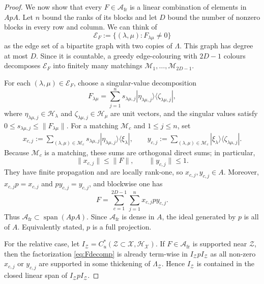 \documentclass[10pt,a4paper]{amsart}
\newcommand{\Hh}{{\mathcal H}}
\newcommand{\Xx}{{\mathcal X}}
\newcommand{\Zz}{{\mathcal Z}}
\begin{document}
\begin{proof}
We now show that every $F\in\mathcal A_{\mathrm{fr}}$ is a linear combination of elements in $ApA$.  Let
$n$ bound the ranks of its blocks and let $D$ bound the number of nonzero
blocks in every row and column.  We can think of
\[\mathcal E_F:=\{(\lambda,\mu):F_{\lambda\mu}\neq0\}\]
as the edge set of a bipartite graph with two copies of $\Lambda$.  This graph
has degree at most $D$.  Since it is countable, a greedy edge-colouring with
$2D-1$ colours decomposes $\mathcal E_F$ into finitely many matchings
$\mathcal M_1,\ldots,\mathcal M_{2D-1}$.

For each
$(\lambda,\mu)\in\mathcal E_F$, choose a singular-value decomposition
\[
F_{\lambda\mu} =\sum_{j=1}^n s_{\lambda\mu,j} |\eta_{\lambda\mu,j}\rangle \langle \zeta_{\lambda\mu,j}|,\]
where $\eta_{\lambda\mu,j}\in\Hh_\lambda$ and
$\zeta_{\lambda\mu,j}\in\Hh_\mu$ are unit vectors, and the singular values satisfy
$0\leq s_{\lambda\mu,j}\leq\|F_{\lambda\mu}\|$.  For a matching
$\mathcal M_c$ and $1\leq j\leq n$, set
\begin{align*}
 x_{c,j}:=\sum_{(\lambda,\mu)\in\mathcal M_c}
     s_{\lambda\mu,j}
    |\eta_{\lambda\mu,j}\rangle \langle \xi_\lambda|, \qquad
 y_{c,j}:=\sum_{(\lambda,\mu)\in\mathcal M_c}
     |\xi_\lambda\rangle \langle \zeta_{\lambda\mu,j}|.
\end{align*}
Because $\mathcal M_c$ is a matching, these sums
are orthogonal direct sums; in particular,
\[\|x_{c,j}\| \leq \|F\|, \qquad \|y_{c,j}\| \leq 1.\]
They have finite propagation and are locally rank-one, so
$x_{c,j},y_{c,j}\in A$.  Moreover, $x_{c,j}p=x_{c,j}$ and
$py_{c,j}=y_{c,j}$, and blockwise one has
\begin{equation}
\label{eq:Fdecomp}F=\sum_{c=1}^{2D-1}\sum_{j=1}^n x_{c,j}p y_{c,j}.
\end{equation}
Thus $\mathcal A_{\mathrm{fr}}\subset \operatorname{span}(ApA)$.  Since
$\mathcal A_{\mathrm{fr}}$ is dense in $A$, the ideal generated by $p$ is all
of $A$. Equivalently stated, $p$ is a full projection.

For the relative case, let $I_\Zz=C_u^*(\Zz\subset\Xx,\Hh_\Xx)$. If $F\in\mathcal A_{\mathrm{fr}}$ is supported near $\Zz$, then the factorization \eqref{eq:Fdecomp} is already term-wise in $I_\Zz p I_\Zz$ as all non-zero $x_{c,j}$ or $y_{c,j}$ are supported in some thickening of $\Lambda_\Zz$. Hence $I_\Zz$ is contained in the closed linear span of $I_\Zz p I_\Zz$.
\end{proof}
\end{document}
